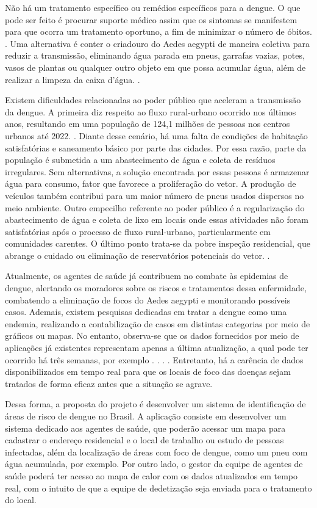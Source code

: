 Não há um tratamento específico ou remédios específicos para a dengue. O que pode ser feito é procurar suporte médico assim que os sintomas se manifestem para que ocorra um tratamento oportuno, a fim de minimizar o número de óbitos. \cite{8}. Uma alternativa é conter o criadouro do Aedes aegypti de maneira coletiva para reduzir a transmissão, eliminando água parada em pneus, garrafas vazias, potes, vasos de plantas ou qualquer outro objeto em que possa acumular água, além de realizar a limpeza da caixa d’água. \cite{9}.

Existem dificuldades relacionadas ao poder público que aceleram a transmissão da dengue. A primeira diz respeito ao fluxo rural-urbano ocorrido nos últimos anos, resultando em uma população de 124,1 milhões de pessoas nos centros urbanos até 2022. \cite{10}. Diante desse cenário, há uma falta de condições de habitação satisfatórias e saneamento básico por parte das cidades. Por essa razão, parte da população é submetida a um abastecimento de água e coleta de resíduos irregulares. Sem alternativas, a solução encontrada por essas pessoas é armazenar água para consumo, fator que favorece a proliferação do vetor. A produção de veículos também contribui para um maior número de pneus usados dispersos no meio ambiente. Outro empecilho referente ao poder público é a regularização do abastecimento de água e coleta de lixo em locais onde essas atividades não foram satisfatórias após o processo de fluxo rural-urbano, particularmente em comunidades carentes. O último ponto trata-se da pobre inspeção residencial, que abrange o cuidado ou eliminação de reservatórios potenciais do vetor. \cite{11}. 

Atualmente, os agentes de saúde já contribuem no combate às epidemias de dengue, alertando os moradores sobre os riscos e tratamentos dessa enfermidade, combatendo a eliminação de focos do Aedes aegypti e monitorando possíveis casos. Ademais, existem pesquisas dedicadas em tratar a dengue como uma endemia, realizando a contabilização de casos em distintas categorias por meio de gráficos ou mapas. No entanto, observa-se que os dados fornecidos por meio de aplicações já existentes representam apenas a última atualização, a qual pode ter ocorrido há três semanas, por exemplo \cite{20}. \cite{21}. \cite{22}. \cite{23}. Entretanto, há a carência de dados disponibilizados em tempo real para que os locais de foco das doenças sejam tratados de forma eficaz antes que a situação se agrave.

Dessa forma, a proposta do projeto é desenvolver um sistema de identificação de áreas de risco de dengue no Brasil. A aplicação consiste em desenvolver um sistema dedicado aos agentes de saúde, que poderão acessar um mapa para cadastrar o endereço residencial e o local de trabalho ou estudo de pessoas infectadas, além da localização de áreas com foco de dengue, como um pneu com água acumulada, por exemplo. Por outro lado, o gestor da equipe de agentes de saúde poderá ter acesso ao mapa de calor com os dados atualizados em tempo real, com o intuito de que a equipe de dedetização seja enviada para o tratamento do local.

